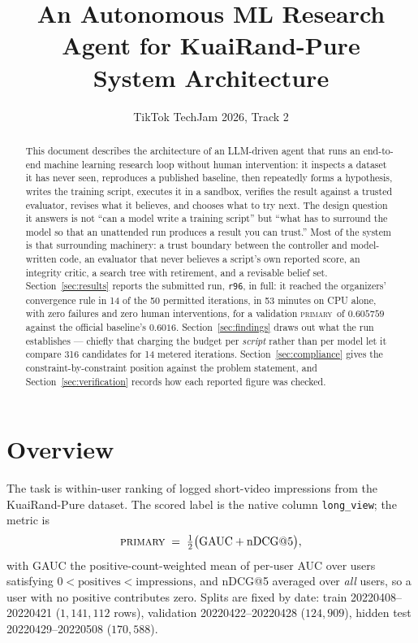 \documentclass[11pt,a4paper]{article}
\title{\vspace{-1.2cm}\textbf{An Autonomous ML Research Agent for KuaiRand-Pure}\\[2pt]
       \large System Architecture}
\author{TikTok TechJam 2026, Track 2}
\date{}
\newcommand{\code}[1]{\texttt{#1}}
\newcommand{\primary}{\textsc{primary}}
\begin{document}
\maketitle
\vspace{-0.9cm}

\begin{abstract}
\noindent
This document describes the architecture of an LLM-driven agent that runs an end-to-end machine
learning research loop without human intervention: it inspects a dataset it has never seen,
reproduces a published baseline, then repeatedly forms a hypothesis, writes the training script,
executes it in a sandbox, verifies the result against a trusted evaluator, revises what it
believes, and chooses what to try next. The design question it answers is not ``can a model write
a training script'' but ``what has to surround the model so that an unattended run produces a
result you can trust.'' Most of the system is that surrounding machinery: a trust boundary
between the controller and model-written code, an evaluator that never believes a script's own
reported score, an integrity critic, a search tree with retirement, and a revisable belief set.
Section~\ref{sec:results} reports the submitted run, \texttt{r96}, in full: it reached the
organizers' convergence rule in 14 of the 50 permitted iterations, in 53 minutes on CPU alone,
with zero failures and zero human interventions, for a validation \primary\ of $0.605759$
against the official baseline's $0.6016$. Section~\ref{sec:findings} draws out what the run
establishes --- chiefly that charging the budget per \emph{script} rather than per model let it
compare 316 candidates for 14 metered iterations. Section~\ref{sec:compliance} gives the
constraint-by-constraint position against the problem statement, and
Section~\ref{sec:verification} records how each reported figure was checked.
\end{abstract}

\section{Overview}

The task is within-user ranking of logged short-video impressions from the KuaiRand-Pure
dataset. The scored label is the native column \code{long\_view}; the metric is
\[
  \primary \;=\; \tfrac{1}{2}\bigl(\mathrm{GAUC} + \mathrm{nDCG@5}\bigr),
\]
with GAUC the positive-count-weighted mean of per-user AUC over users satisfying
$0 < \text{positives} < \text{impressions}$, and nDCG@5 averaged over \emph{all} users, so a user
with no positive contributes zero. Splits are fixed by date: train
\mbox{20220408--20220421} ($1{,}141{,}112$ rows), validation \mbox{20220422--20220428}
($124{,}909$), hidden test \mbox{20220429--20220508} ($170{,}588$).
\end{document}
